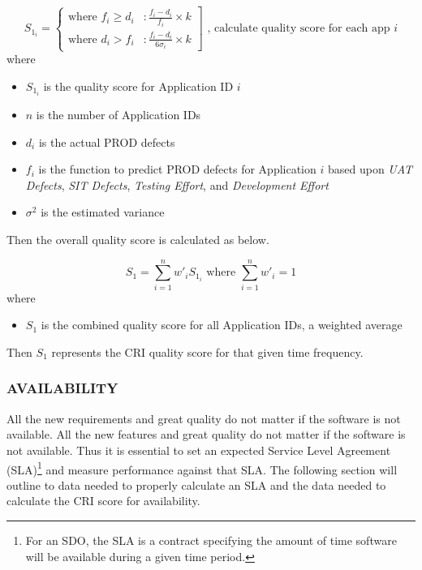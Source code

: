 \documentclass[SDSUThesis.tex]{subfiles}
\begin{document}
                \begin{displaymath}
                   S_{1_i} = \left\{
                     \begin{array}{lr}
                       \text{where } f_i \geq d_i & :  \frac{f_i - d_i}{f_i} \times k  \\
                       \text{where } d_i > f_i  & : \frac{f_i-d_i }{6\sigma_i} \times k
                     \end{array}
                   \right] \text{   , calculate quality score for each app $i$}
                \end{displaymath} 
                where
                \begin{itemize}
                    \item $S_{1_i}$ is the quality score for Application ID $i$
                    \item $n$ is the number of Application IDs
                    \item $d_i$ is the actual PROD defects
                    \item $f_i$ is the function to predict PROD defects for Application $i$ based upon 
                        \textit{UAT Defects}, \textit{SIT Defects}, \textit{Testing Effort}, 
                        and \textit{Development Effort}
                    \item $\sigma^2$ is the estimated variance
                \end{itemize}
                
                Then the overall quality score is calculated as below.
                
                \[
                    S_{1} = \sum\limits^n_{i=1} w'_i S_{1_i} \text{ where } \sum\limits^n_{i=1} w'_i = 1
                \]
                where
                \begin{itemize}
                    \item $S_1$ is the combined quality score for all Application IDs, 
                    a weighted average
                \end{itemize}
                
                Then $S_1$ represents the CRI quality score for that given time 
                frequency.
        


        \subsubsection{AVAILABILITY}
            All the new requirements and great quality do not matter if the software is not available.
            All the new features and great quality do not matter if the software is not available.  Thus it
            is essential to set an expected Service Level Agreement (SLA)\footnote{For an SDO, the SLA is a 
            contract specifying the amount of time software will be available during a
            given time period. } and measure 
            performance against that SLA.  The following section will outline to data needed to properly
            calculate an SLA and the data needed to calculate the CRI score for availability.
            
\end{document}
